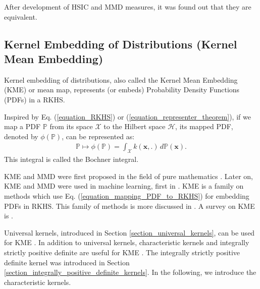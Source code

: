 \documentclass[lang=cn,10pt]{gorgeousnbook}
\numberwithin{equation}{section}%
\numberwithin{figure}{section}%
\begin{document}
\begin{remark}
After development of HSIC and MMD measures, it was found out that they are equivalent.
\end{remark}



\subsection{Kernel Embedding of Distributions (Kernel Mean Embedding)}\label{section_kernel_embedding_distributions}


\begin{definition}
Kernel embedding of distributions, also called the Kernel Mean Embedding (KME) or mean map, represents (or embeds) Probability Density Functions (PDFs) in a RKHS. 
\end{definition}

\begin{corollary}
Inspired by Eq. (\ref{equation_RKHS}) or (\ref{equation_representer_theorem}), if we map a PDF $\mathbb{P}$ from its space $\mathcal{X}$ to the Hilbert space $\mathcal{H}$, its mapped PDF, denoted by $\phi(\mathbb{P})$, can be represented as:
\begin{align}\label{equation_mapping_PDF_to_RKHS}
\mathbb{P} \mapsto \phi(\mathbb{P}) = \int_\mathcal{X} k(\boldsymbol{x}, .)\, d\mathbb{P}(\boldsymbol{x}).
\end{align}
This integral is called the Bochner integral.
\end{corollary}



KME and MMD were first proposed in the field of pure mathematics \cite{guilbart1978etude}.  
Later on, KME and MMD were used in machine learning, first in \cite{smola2007hilbert}.
KME is a family on methods which use Eq. (\ref{equation_mapping_PDF_to_RKHS}) for embedding PDFs in RKHS. This family of methods is more discussed in \cite{sriperumbudur2010hilbert}. 
A survey on KME is \cite{muandet2016kernel}. 

Universal kernels, introduced in Section \ref{section_universal_kernels}, can be used for KME \cite{sriperumbudur2011universality,simon2018kernel}. In addition to universal kernels, characteristic kernels and integrally strictly positive definite are useful for KME \cite{sriperumbudur2011universality,simon2018kernel}. 
The integrally strictly positive definite kernel was introduced in Section \ref{section_integrally_positive_definite_kernels}. In the following, we introduce the characteristic kernels. 
\end{document}
